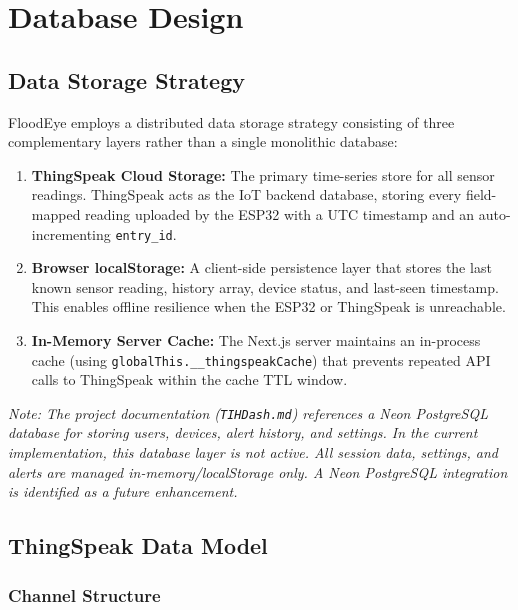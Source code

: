 ﻿%
\chapter{Database Design}

\section{Data Storage Strategy}

FloodEye employs a distributed data storage strategy consisting of three complementary layers rather than a single monolithic database:

\begin{enumerate}[leftmargin=1.5em]
  \item \textbf{ThingSpeak Cloud Storage:} The primary time-series store for all sensor readings. ThingSpeak acts as the IoT backend database, storing every field-mapped reading uploaded by the ESP32 with a UTC timestamp and an auto-incrementing \texttt{entry\_\allowbreak{}id}.
  \item \textbf{Browser localStorage:} A client-side persistence layer that stores the last known sensor reading, history array, device status, and last-seen timestamp. This enables offline resilience when the ESP32 or ThingSpeak is unreachable.
  \item \textbf{In-Memory Server Cache:} The Next.js server maintains an in-process cache (using \texttt{globalThis.\allowbreak{}\_\allowbreak{}\_\allowbreak{}thingspeakCache}) that prevents repeated API calls to ThingSpeak within the cache TTL window.
\end{enumerate}

\textit{Note: The project documentation (\texttt{TIHDash.\allowbreak{}md}) references a Neon PostgreSQL database for storing users, devices, alert history, and settings. In the current implementation, this database layer is not active. All session data, settings, and alerts are managed in-memory/localStorage only. A Neon PostgreSQL integration is identified as a future enhancement.}

\section{ThingSpeak Data Model}

\subsection{Channel Structure}

